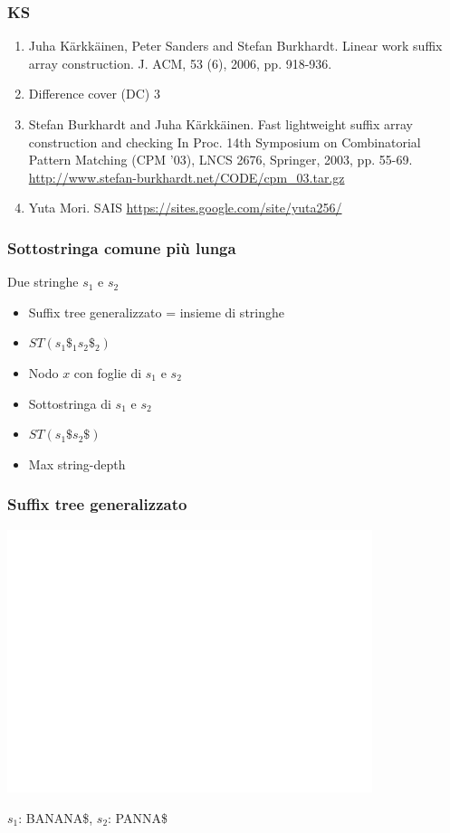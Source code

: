 \begin{frame}
\frametitle{KS}
\begin{enumerate}
\item
Juha Kärkkäinen, Peter Sanders and Stefan Burkhardt.
Linear work suffix array construction. J. ACM, 53 (6), 2006, pp. 918-936.
\item
Difference cover (DC) 3
\item
Stefan Burkhardt and Juha Kärkkäinen.
Fast lightweight suffix array construction and checking
In Proc. 14th Symposium on Combinatorial Pattern Matching (CPM '03), LNCS 2676,
Springer, 2003, pp. 55-69. \url{http://www.stefan-burkhardt.net/CODE/cpm_03.tar.gz}
\item
Yuta Mori.
SAIS \url{https://sites.google.com/site/yuta256/}
\end{enumerate}
\end{frame}


\begin{frame}[fragile]
\frametitle{Sottostringa comune più lunga}
\begin{block}{Due stringhe $s_{1}$ e $s_{2}$}
\begin{itemize}[<+->]
\item
Suffix tree generalizzato = insieme di stringhe
\item
$ST(s_{1}\$_{1}s_{2}\$_{2})$
\item
Nodo $x$ con foglie di $s_{1}$ e $s_{2}$
\item
Sottostringa di $s_{1}$ e $s_{2}$
\item
$ST(s_{1}\$s_{2}\$)$
\item
Max string-depth
\end{itemize}
\end{block}
\end{frame}



\begin{frame}
\frametitle{Suffix tree generalizzato}
\begin{center}
\includegraphics[width=0.8\textwidth]{ST-banana-panna}
\end{center}
$s_{1}$: BANANA\$, $s_{2}$: PANNA\$
\end{frame}


